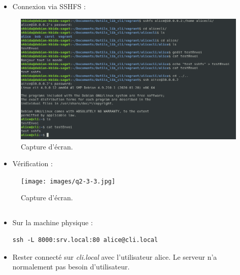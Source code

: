 \documentclass{article}
\begin{document}
\begin{itemize}
    \item Connexion via SSHFS :
\end{itemize}

\begin{figure}[h]
\centering
\includegraphics[width=\textwidth]{images/q2-3-2.jpg}
\caption{\label{fig:frog}Capture d'écran.}
\end{figure}

\begin{itemize}
    \item Vérification :
\end{itemize}

\begin{figure}[h]
\centering
\texttt{[image: images/q2-3-3.jpg]}
\caption{\label{fig:frog}Capture d'écran.}
\end{figure}
\FloatBarrier
\subsection{}

\begin{itemize}
\item Sur la machine physique :
\begin{lstlisting}
ssh -L 8000:srv.local:80 alice@cli.local
\end{lstlisting}
\item Rester connecté sur \emph{cli.local} avec l’utilisateur alice. Le serveur n’a normalement pas besoin d’utilisateur.
\end{itemize}

\subsection{}
\end{document}
